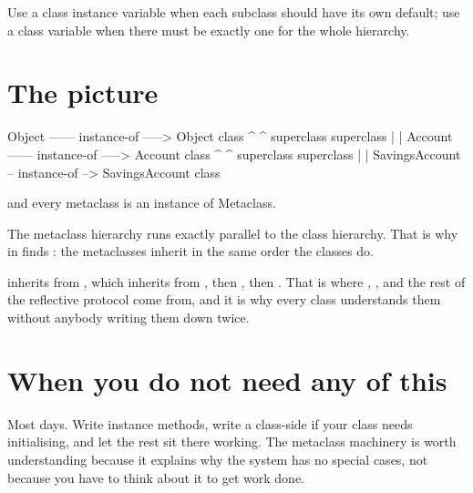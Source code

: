 Use a class instance variable when each subclass should have its own default;
use a class variable when there must be exactly one for the whole hierarchy.

\section{The picture}

\begin{plain}
      Object  ------ instance-of ----->  Object class
        ^                                     ^
     superclass                           superclass
        |                                     |
      Account ------ instance-of ----->  Account class
        ^                                     ^
     superclass                           superclass
        |                                     |
  SavingsAccount -- instance-of --> SavingsAccount class

  and every metaclass is an instance of Metaclass.
\end{plain}

The metaclass hierarchy runs exactly parallel to the class hierarchy. That is
why  in  finds
: the metaclasses inherit in the same order the classes
do.

 inherits from , which inherits from
, then , then . That is where
, ,  and the rest of the reflective
protocol come from, and it is why every class understands them without anybody
writing them down twice.

\section{When you do not need any of this}

Most days. Write instance methods, write a class-side  if your class
needs initialising, and let the rest sit there working. The metaclass
machinery is worth understanding because it explains why the system has no
special cases, not because you have to think about it to get work done.
